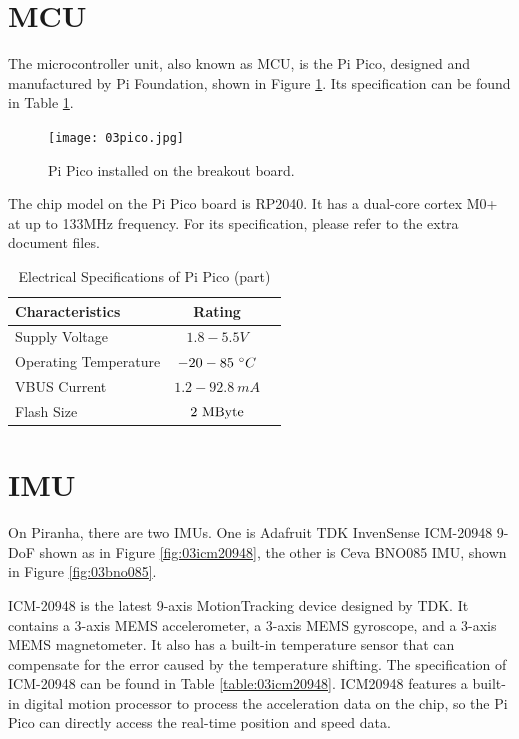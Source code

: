 \section{MCU}

The microcontroller unit, also known as MCU, is the Pi Pico, designed and manufactured by Pi Foundation, shown in Figure \ref{fig:03pico}. Its specification can be found in Table \ref{table:03pico}.

\begin{figure}
    \centering
    \texttt{[image: 03pico.jpg]}
    \caption{Pi Pico installed on the breakout board.}
    \label{fig:03pico}
\end{figure}

The chip model on the Pi Pico board is RP2040. It has a dual-core cortex M0+ at up to 133MHz frequency. For its specification, please refer to the extra document files.

\begin{table}[ht]
\caption{Electrical Specifications of Pi Pico (part)} %
\centering %
\renewcommand{\arraystretch}{0.8}
\begin{tabular}{l c l} %
\hline
\textbf{Characteristics} & \textbf{Rating} \\ 
\hline %
Supply Voltage & $1.8-5.5V$ \\
Operating Temperature & $-20 - 85\ \degree C$ \\
VBUS Current & $1.2-92.8\ mA$ \\
Flash Size & $2\ {\rm MByte}$ \\
\hline
\end{tabular}
\label{table:03pico} %
\end{table}

\section{IMU}

On Piranha, there are two IMUs. One is Adafruit TDK InvenSense ICM-20948 9-DoF shown as in Figure \ref{fig:03icm20948}, the other is Ceva BNO085 IMU, shown in Figure \ref{fig:03bno085}.  

ICM-20948 is the latest 9-axis MotionTracking device designed by TDK. It contains a 3-axis MEMS accelerometer, a 3-axis MEMS gyroscope, and a 3-axis MEMS magnetometer. It also has a built-in temperature sensor that can compensate for the error caused by the temperature shifting. The specification of ICM-20948 can be found in Table \ref{table:03icm20948}. ICM20948 features a built-in digital motion processor to process the acceleration data on the chip, so the Pi Pico can directly access the real-time position and speed data.

